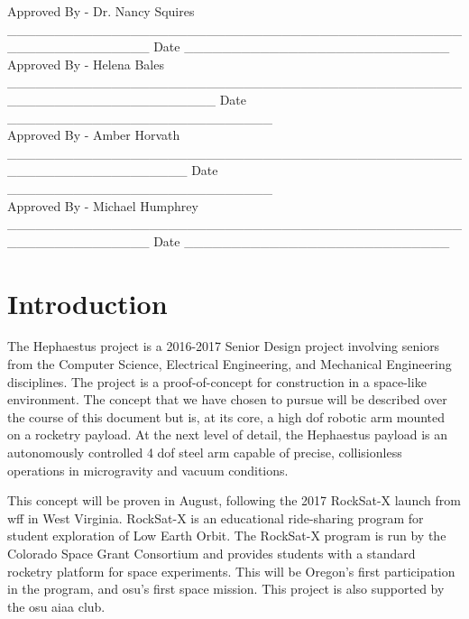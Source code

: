 \documentclass[letterpaper,10pt]{article}
\newenvironment{bottompar}{\par\vspace*{\fill}}{\clearpage}
\begin{document}
\begin{bottompar}
Approved By - Dr. Nancy Squires
\_\_\_\_\_\_\_\_\_\_\_\_\_\_\_\_\_\_\_\_\_\_\_\_\_\_\_\_\_\_\_\_\_\_\_\_\_\_\_\_\_\_\_\_\_\_\_\_\_\_\_\_\_\_\_\_\_\_\_\_\_\_\_
Date \_\_\_\_\_\_\_\_\_\_\_\_\_\_\_\_\_\_\_\_\_\_\_\_\_\_\_\_ \\


Approved By - Helena Bales
\_\_\_\_\_\_\_\_\_\_\_\_\_\_\_\_\_\_\_\_\_\_\_\_\_\_\_\_\_\_\_\_\_\_\_\_\_\_\_\_\_\_\_\_\_\_\_\_\_\_\_\_\_\_\_\_\_\_\_\_\_\_\_\_\_\_\_\_\_\_
Date \_\_\_\_\_\_\_\_\_\_\_\_\_\_\_\_\_\_\_\_\_\_\_\_\_\_\_\_ \\


Approved By - Amber Horvath
\_\_\_\_\_\_\_\_\_\_\_\_\_\_\_\_\_\_\_\_\_\_\_\_\_\_\_\_\_\_\_\_\_\_\_\_\_\_\_\_\_\_\_\_\_\_\_\_\_\_\_\_\_\_\_\_\_\_\_\_\_\_\_\_\_\_\_
Date \_\_\_\_\_\_\_\_\_\_\_\_\_\_\_\_\_\_\_\_\_\_\_\_\_\_\_\_ \\


Approved By - Michael Humphrey
\_\_\_\_\_\_\_\_\_\_\_\_\_\_\_\_\_\_\_\_\_\_\_\_\_\_\_\_\_\_\_\_\_\_\_\_\_\_\_\_\_\_\_\_\_\_\_\_\_\_\_\_\_\_\_\_\_\_\_\_\_\_\_
Date \_\_\_\_\_\_\_\_\_\_\_\_\_\_\_\_\_\_\_\_\_\_\_\_\_\_\_\_ \\
\end{bottompar}

\clearpage
\tableofcontents
\clearpage

\section{Introduction}
The Hephaestus project is a 2016-2017 Senior Design project involving seniors
from the Computer Science, Electrical Engineering, and Mechanical Engineering 
disciplines. 
The project is a proof-of-concept for construction in a space-like environment.
The concept that we have chosen to pursue will be described over the course of 
this document but is, at its core, a high \gls{dof} robotic arm mounted on a 
rocketry \gls{payload}. 
At the next level of detail, the Hephaestus \gls{payload} is an autonomously 
controlled 4 \gls{dof} steel arm capable of precise, collisionless operations 
in \gls{microgravity} and vacuum conditions. 

This concept will be proven in August, following the 2017 RockSat-X launch from
\gls{wff} in West Virginia. 
RockSat-X is an educational ride-sharing program for student exploration of Low
Earth Orbit. 
The RockSat-X program is run by the Colorado Space Grant Consortium and 
provides students with a standard rocketry platform for space experiments.
This will be Oregon's first participation in the program, and \gls{osu}'s first
space mission.
This project is also supported by the \gls{osu} \gls{aiaa} club.
\end{document}
